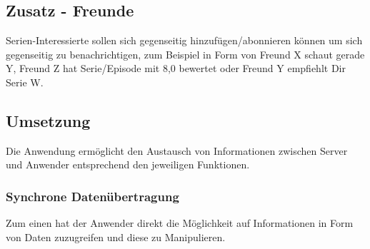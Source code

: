 \documentclass[a4paper]{article}
\begin{document}
\subsection{Zusatz - Freunde}
Serien-Interessierte sollen sich gegenseitig hinzufügen/abonnieren können um sich gegenseitig zu benachrichtigen, zum Beispiel in Form von Freund X schaut gerade Y, Freund Z hat Serie/Episode mit 8,0 bewertet oder Freund Y empfiehlt Dir Serie W.


\subsection{Umsetzung}
Die Anwendung ermöglicht den Austausch von Informationen zwischen Server und Anwender entsprechend den jeweiligen Funktionen.

\subsubsection{Synchrone Datenübertragung}

Zum einen hat der Anwender direkt die Möglichkeit auf Informationen in Form von Daten zuzugreifen und diese zu Manipulieren.
\end{document}
